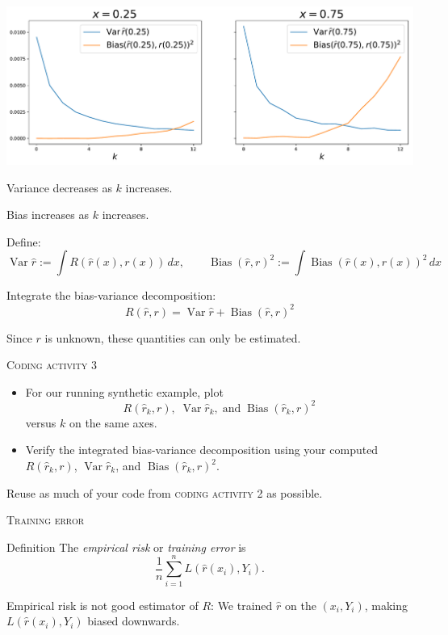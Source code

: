 \documentclass[xcolor={dvipsnames}]{beamer}
\renewcommand{\hat}{\widehat}
\DeclareMathOperator{\Bias}{Bias}
\DeclareMathOperator{\Var}{Var}
\begin{document}
\begin{frame}{}
    \includegraphics[scale=0.36]{bias_variance.pdf}

    Variance decreases as $k$ increases.

    Bias increases as $k$ increases.
\end{frame}

\begin{frame}{}
    Define:
    \[
        \Var \hat r := \int R(\hat r(x), r(x))\,dx,\qquad \Bias(\hat r, r)^2 := \int\Bias(\hat r(x), r(x))^2\,dx
    \]
    
    Integrate the bias-variance decomposition:
    \[
        R(\hat r, r) = \Var \hat r + \Bias(\hat r, r)^2
    \]

    Since $r$ is unknown, these quantities can only be estimated.
\end{frame}

\begin{frame}{\textsc{Coding activity 3}}
    \begin{itemize}
        \item For our running synthetic example, plot 
        \[
            R(\hat r_k, r),\; \Var \hat r_k,\; \text{and}\; \Bias(\hat r_k, r)^2
        \]
        versus $k$ on the same axes.

        \item Verify the integrated bias-variance decomposition using your computed
        $R(\hat r_k, r)$, $\Var \hat r_k$, and $\Bias(\hat r_k, r)^2$.
    \end{itemize}
     
    Reuse as much of your code from \textsc{coding activity 2} as possible.
\end{frame}

\begin{frame}{\textsc{Training error}}
    \begin{block}{Definition}
        The \emph{empirical risk} or \emph{training error} is
        \[
            \frac1n\sum_{i=1}^n L(\hat r(x_i), Y_i).
        \]
    \end{block}
    Empirical risk is not good estimator of $R$: We trained $\hat r$ on the 
    $(x_i,Y_i)$, making $L(\hat r(x_i), Y_i)$ biased downwards.
\end{frame}
\end{document}
